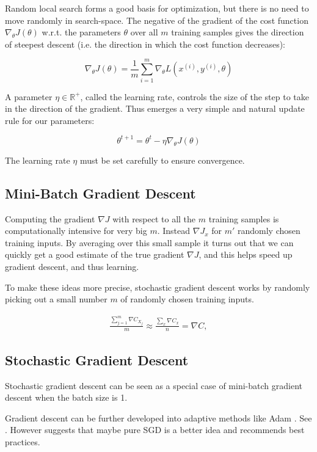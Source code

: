 Random local search forms a good basis for optimization, but there is no need to move randomly in search-space. The negative of the gradient of the cost function $\nabla_{\theta} J(\theta)$ w.r.t. the parameters $\theta$ over all $m$ training samples gives the direction of steepest descent (i.e. the direction in which the cost function decreases):

$$
\nabla_{\theta} J(\theta) = \frac{1}{m} \sum_{i=1}^{m} \nabla_{\theta} L(x^{(i)}, y^{(i)}, \theta)
$$

A parameter $\eta \in \mathbb{{R}^{+}}$, called the learning rate, controls the size of the step to take in the direction of the gradient. Thus emerges a very simple and natural update rule for our parameters:

$$
\theta^{t+1} = \theta^t - \eta \nabla_{\theta} J(\theta)
$$

The learning rate $\eta$ must be set carefully to ensure convergence.

\subsection{Mini-Batch Gradient Descent}

Computing the gradient $\nabla J$ with respect to all the $m$ training samples is computationally intensive for very big $m$. Instead $\nabla J_x$ for $m'$ randomly chosen training inputs. By averaging over this small sample it turns out that we can quickly get a good estimate of the true gradient $\nabla J$, and this helps speed up gradient descent, and thus learning.

To make these ideas more precise, stochastic gradient descent works by randomly picking out a small number $m$ of randomly chosen training inputs. 

\begin{eqnarray}
  \frac{\sum_{j=1}^m \nabla C_{X_{j}}}{m} \approx \frac{\sum_x \nabla C_x}{n} = \nabla C,
\end{eqnarray}


\subsection{Stochastic Gradient Descent}

Stochastic gradient descent can be seen as a special case of mini-batch gradient descent when the batch size is 1.

Gradient descent can be further developed into adaptive methods like Adam . See \cite{ruder2016}. However \cite{wilson2017} suggests that maybe pure SGD is a better idea and recommends best practices.

